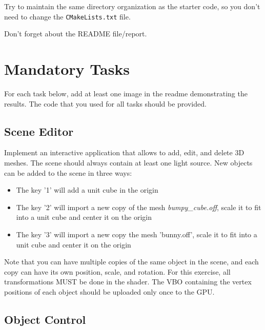 \documentclass[11pt]{article}
\begin{document}
Try to maintain the same directory organization as the starter code, so you don't need to change the \texttt{CMakeLists.txt} file.

Don't forget about the README file/report.

\section{Mandatory Tasks}
For each task below, add at least one image in the readme demonstrating the results. The code that you used for all tasks should be provided.

\subsection{Scene Editor}

Implement an interactive application that allows to add, edit, and delete 3D meshes. The scene should always contain at least one light source. New objects can be added to the scene in three ways:
\begin{itemize}
\item The key '1' will add a unit cube in the origin
\item The key '2' will import a new copy of the mesh \emph{bumpy\_cube.off}, scale it to fit into a unit cube and center it on the origin
\item The key '3' will import a new copy the mesh 'bunny.off', scale it to fit into a unit cube and center it on the origin
\end{itemize}

Note that you can have multiple copies of the same object in the scene, and each copy can have its own position, scale, and rotation.
%
For this exercise, all transformations MUST be done in the shader. The VBO containing the vertex positions of each object should be uploaded only once to the GPU. 

\subsection{Object Control}
\end{document}
